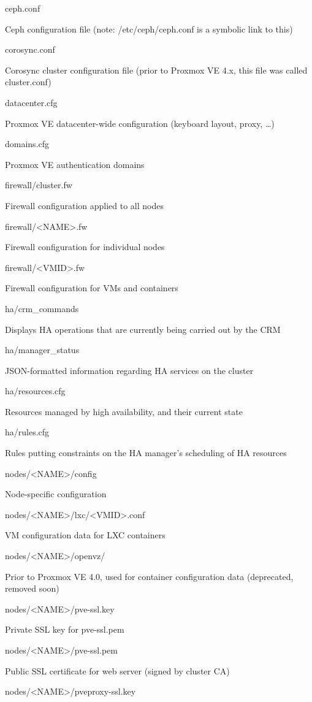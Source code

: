 ceph.conf

Ceph configuration file (note: /etc/ceph/ceph.conf is a symbolic link to this)

corosync.conf

Corosync cluster configuration file (prior to Proxmox VE 4.x, this file was called cluster.conf)

datacenter.cfg

Proxmox VE datacenter-wide configuration (keyboard layout, proxy, …)

domains.cfg

Proxmox VE authentication domains

firewall/cluster.fw

Firewall configuration applied to all nodes

firewall/<NAME>.fw

Firewall configuration for individual nodes

firewall/<VMID>.fw

Firewall configuration for VMs and containers

ha/crm_commands

Displays HA operations that are currently being carried out by the CRM

ha/manager_status

JSON-formatted information regarding HA services on the cluster

ha/resources.cfg

Resources managed by high availability, and their current state

ha/rules.cfg

Rules putting constraints on the HA manager’s scheduling of HA resources

nodes/<NAME>/config

Node-specific configuration

nodes/<NAME>/lxc/<VMID>.conf

VM configuration data for LXC containers

nodes/<NAME>/openvz/

Prior to Proxmox VE 4.0, used for container configuration data (deprecated, removed soon)

nodes/<NAME>/pve-ssl.key

Private SSL key for pve-ssl.pem

nodes/<NAME>/pve-ssl.pem

Public SSL certificate for web server (signed by cluster CA)

nodes/<NAME>/pveproxy-ssl.key

